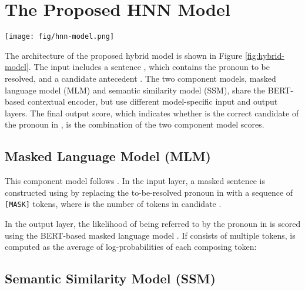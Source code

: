 \documentclass[11pt,a4paper]{article}
\begin{document}
\section{The Proposed HNN Model}
\label{sec:method}
\begin{figure*}
	\centering
	\vspace{-1mm}
{
 	\texttt{[image: fig/hnn-model.png]}


    }
\caption{Architecture of the hybrid model for commonsense reasoning. The model consists of two component models, a masked language model (MLM) and a semantic similarity model (SSM). The input includes the sentence , which contains a pronoun to be resolve, and a candidate antecedent . The two component models share the BERT-based contextual encoder, but use different model-specific input and output layers. The final output score is the combination of the two component model scores.}
\label{fig:hybrid-model}
\end{figure*}

The architecture of the proposed hybrid model is shown in Figure \ref{fig:hybrid-model}. The input includes a sentence , which contains the pronoun to be resolved, and a candidate antecedent . The two component models, masked language model (MLM) and semantic similarity model (SSM), share the BERT-based contextual encoder, but use different model-specific input and output layers. The final output score, which indicates whether  is the correct candidate of the pronoun in , is the combination of the two component model scores.

\subsection{Masked Language Model (MLM)}
\label{sec:mlm}

This component model follows \citet{kocijan2019surprisingly}.
In the input layer, a masked sentence is constructed using  by replacing the to-be-resolved pronoun in  with a sequence of  \texttt{[MASK]} tokens, where  is the number of tokens in candidate .

In the output layer, the likelihood of  being referred to by the pronoun in  is scored using the BERT-based masked language model . If  consists of multiple tokens,  is computed as the average of log-probabilities of each composing token:


\subsection{Semantic Similarity Model (SSM)}
\label{sec:ssm}
\end{document}
